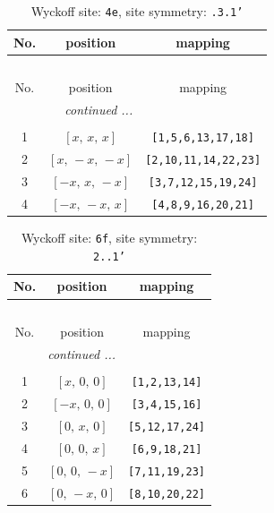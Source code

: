 \documentclass[fleqn,8pt]{jsarticle}
\begin{document}
\begin{longtable}{ccc}
\caption{Wyckoff site: {\tt 4e}, site symmetry: {\tt .3.1'}}
 \\
 \hline \hline
No. & position & mapping \\ \hline \endfirsthead

\multicolumn{2}{l}{\tablename\ \thetable{}} \\
 \hline \hline
No. & position & mapping \\ \hline \endhead

 \hline \hline
\multicolumn{2}{r}{\footnotesize\it continued ...} \\ \endfoot

 \hline \hline
\multicolumn{2}{r}{} \\ \endlastfoot

1 & $\left[ x,\, x,\, x \right]$ & {\tt [1,5,6,13,17,18]} \\ \hline
2 & $\left[ x,\, - x,\, - x \right]$ & {\tt [2,10,11,14,22,23]} \\ \hline
3 & $\left[ - x,\, x,\, - x \right]$ & {\tt [3,7,12,15,19,24]} \\ \hline
4 & $\left[ - x,\, - x,\, x \right]$ & {\tt [4,8,9,16,20,21]} \\
\end{longtable}
\renewcommand{\arraystretch}{1.2}
\begin{longtable}{ccc}
\caption{Wyckoff site: {\tt 6f}, site symmetry: {\tt 2..1'}}
 \\
 \hline \hline
No. & position & mapping \\ \hline \endfirsthead

\multicolumn{2}{l}{\tablename\ \thetable{}} \\
 \hline \hline
No. & position & mapping \\ \hline \endhead

 \hline \hline
\multicolumn{2}{r}{\footnotesize\it continued ...} \\ \endfoot

 \hline \hline
\multicolumn{2}{r}{} \\ \endlastfoot

1 & $\left[ x,\, 0,\, 0 \right]$ & {\tt [1,2,13,14]} \\ \hline
2 & $\left[ - x,\, 0,\, 0 \right]$ & {\tt [3,4,15,16]} \\ \hline
3 & $\left[ 0,\, x,\, 0 \right]$ & {\tt [5,12,17,24]} \\ \hline
4 & $\left[ 0,\, 0,\, x \right]$ & {\tt [6,9,18,21]} \\ \hline
5 & $\left[ 0,\, 0,\, - x \right]$ & {\tt [7,11,19,23]} \\ \hline
6 & $\left[ 0,\, - x,\, 0 \right]$ & {\tt [8,10,20,22]} \\
\end{longtable}
\end{document}
